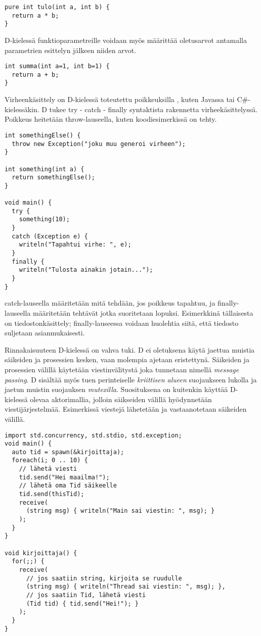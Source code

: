 \documentclass[11pt,oneside,a4paper]{article}
\begin{document}
\begin{verbatim}
pure int tulo(int a, int b) {
  return a * b;
}
\end{verbatim}

D-kielessä funktioparametreille voidaan myös määrittää oletusarvot antamalla parametrien esittelyn jälkeen niiden arvot.
\begin{verbatim}
int summa(int a=1, int b=1) {
  return a + b;
}
\end{verbatim}

Virheenkäsittely on D-kielessä toteutettu poikkeuksilla \cite{ALE10}, kuten Javassa tai C\#-kielessäkin. D tukee try - catch - finally syntaktista rakennetta virheekäsittelyssä. Poikkeus heitetään throw-lauseella, kuten koodiesimerkissä on tehty.

\begin{verbatim}
int somethingElse() {
  throw new Exception("joku muu generoi virheen");
}

int something(int a) {
  return somethingElse();
}

void main() {
  try {
    something(10);
  }
  catch (Exception e) {
    writeln("Tapahtui virhe: ", e);
  }
  finally {
    writeln("Tulosta ainakin jotain...");
  }
}
\end{verbatim}

catch-lauseella määritetään mitä tehdään, jos poikkeus tapahtuu, ja finally-lauseella määritetään tehtävät jotka suoritetaan lopuksi. Esimerkkinä tällaisesta on tiedostonkäsittely; finally-lauseessa voidaan huolehtia siitä, että tiedosto suljetaan asianmukaisesti.

Rinnakaisuuteen D-kielessä on vahva tuki. D ei oletuksena käytä jaettua muistia säikeiden ja prosessien kesken, vaan molempia ajetaan eristettynä. Säikeiden ja prosessien välillä käytetään viestinvälitystä joka tunnetaan nimellä \textit{message passing}. D sisältää myös tuen perinteiselle \textit{kriittisen alueen} suojaukseen lukolla ja jaetun muistin suojauksen \textit{mutexilla}. Suosituksena on kuitenkin käyttää D-kielessä olevaa aktorimallia, jolloin säikseiden välillä hyödynnetään viestijärjestelmää. Esimerkissä viestejä lähetetään ja vastaanotetaan säikeiden välillä.

\begin{verbatim}
import std.concurrency, std.stdio, std.exception;
void main() {
  auto tid = spawn(&kirjoittaja);
  foreach(i; 0 .. 10) {
    // lähetä viesti
    tid.send("Hei maailma!");
    // lähetä oma Tid säikeelle
    tid.send(thisTid);
    receive(
      (string msg) { writeln("Main sai viestin: ", msg); }
    );
  }
}

void kirjoittaja() {
  for(;;) {
    receive(
      // jos saatiin string, kirjoita se ruudulle
      (string msg) { writeln("Thread sai viestin: ", msg); }, 
      // jos saatiin Tid, lähetä viesti
      (Tid tid) { tid.send("Hei!"); }
    );
  }
}

\end{verbatim}
\end{document}
